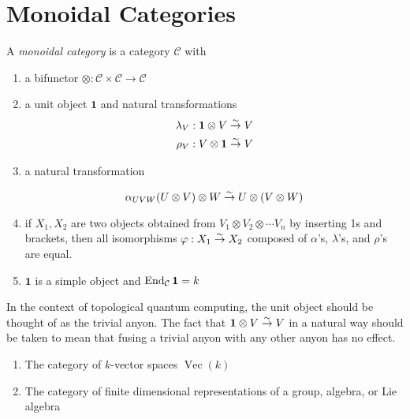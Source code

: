 \section{Monoidal Categories}
\begin{defn}
    A \emph{monoidal category} is a category $\mathcal{C}$ with 
    \begin{enumerate}
    \renewcommand{\labelenumi}{\roman{enumi})}
        \item a bifunctor $\otimes: \mathcal{C} \times \mathcal{C} \to
            \mathcal{C}$
        \item a unit object $\mathbf{1}$ and natural transformations
            \begin{align}
                \lambda_V &: \mathbf{1} \otimes V \overset{\sim}{\rightarrow} V \\
                \rho_V &: V \otimes \mathbf{1} \overset{\sim}{\rightarrow} V
            \end{align}
        \item a natural transformation 

            \begin{equation}
                \alpha_{UVW} (U \otimes V) \otimes W \overset{\sim}{\rightarrow} U \otimes (V \otimes W)
            \end{equation}

        \item if $X_1, X_2$ are two objects obtained from $V_1 \otimes V_2
            \otimes \cdots V_n$ by inserting 1s and brackets, then all
            isomorphisms $\varphi: X_1 \overset{\sim}{\rightarrow} X_2$ composed of $\alpha$'s,
            $\lambda$'s, and $\rho$'s are equal. 
        \item $\mathbf{1}$ is a simple object and $\operatorname{End}_\mathcal{C} \mathbf{1} = k$
    \end{enumerate}

\end{defn}

In the context of topological quantum computing, the unit object should be
thought of as the trivial anyon. The fact that $\mathbf{1} \otimes V \overset{\sim}{\rightarrow} V$
in a natural way should be taken to mean that fusing a trivial anyon with any
other anyon has no effect.

\begin{example}
    \begin{enumerate}
    \renewcommand{\labelenumi}{\roman{enumi})}
        \item The category of $k$-vector spaces $\operatorname{Vec}(k)$
        \item The category of finite dimensional representations of a group, algebra, or Lie algebra
    \end{enumerate}
\end{example}

